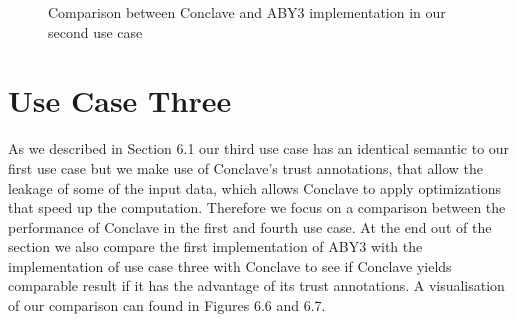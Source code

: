 \begin{figure}[H]
	\caption{Comparison between Conclave and ABY3 implementation in our second use case}
\end{figure}



\section{Use Case Three}
As we described in Section 6.1 our third use case has an identical semantic to our first use case but we make use of Conclave's trust annotations, that allow the leakage of some of the input data, which allows Conclave to apply optimizations that speed up the computation. Therefore we focus on a comparison between the performance of Conclave in the first and fourth use case. At the end out of the section we also compare the first implementation of ABY3 with the implementation of use case three with Conclave to see if Conclave yields comparable result if it has the advantage of its trust annotations.
 A visualisation of our comparison can found in Figures 6.6 and 6.7. 
